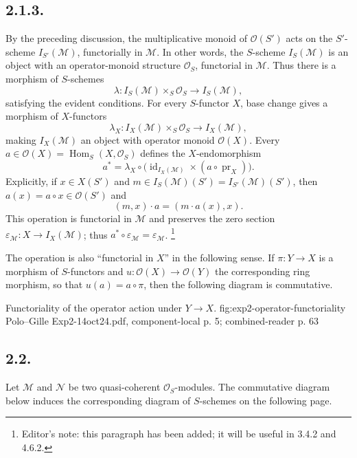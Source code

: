 \subsection*{2.1.3.}
By the preceding discussion, the multiplicative monoid of
\(\mathcal O(S')\) acts on the \(S'\)-scheme
\(I_{S'}(\mathcal M)\), functorially in \(\mathcal M\). In other words,
the \(S\)-scheme \(I_S(\mathcal M)\) is an object with an operator-monoid
structure \(\mathcal O_S\), functorial in \(\mathcal M\). Thus there is
a morphism of \(S\)-schemes
\[
  \lambda:I_S(\mathcal M)\times_S\mathcal O_S
  \longrightarrow I_S(\mathcal M),
\]
satisfying the evident conditions. For every \(S\)-functor \(X\), base
change gives a morphism of \(X\)-functors
\[
  \lambda_X:I_X(\mathcal M)\times_S\mathcal O_S
  \longrightarrow I_X(\mathcal M),
\]
making \(I_X(\mathcal M)\) an object with operator monoid
\(\mathcal O(X)\). Every
\(a\in\mathcal O(X)=\operatorname{Hom}_S(X,\mathcal O_S)\) defines the
\(X\)-endomorphism
\[
  a^*=\lambda_X\circ
  \bigl(\operatorname{id}_{I_X(\mathcal M)}\times(a\circ\operatorname{pr}_X)\bigr).
\]
Explicitly, if \(x\in X(S')\) and
\(m\in I_S(\mathcal M)(S')=I_{S'}(\mathcal M)(S')\), then
\(a(x)=a\circ x\in\mathcal O(S')\) and
\[
  (m,x)\cdot a=(m\cdot a(x),x).
\]
This operation is functorial in \(\mathcal M\) and preserves the zero
section \(\varepsilon_{\mathcal M}:X\to I_X(\mathcal M)\); thus
\(a^*\circ\varepsilon_{\mathcal M}=\varepsilon_{\mathcal M}\).
\footnote{Editor's note: this paragraph has been added; it will be useful
in 3.4.2 and 4.6.2.}

The operation is also ``functorial in \(X\)'' in the following sense. If
\(\pi:Y\to X\) is a morphism of \(S\)-functors and
\(u:\mathcal O(X)\to\mathcal O(Y)\) the corresponding ring morphism,
so that \(u(a)=a\circ\pi\), then the following diagram is commutative.

  {Functoriality of the operator action under \(Y\to X\).}
  {fig:exp2-operator-functoriality}
  {Polo--Gille Exp2-14oct24.pdf, component-local p. 5; combined-reader p. 63}

\subsection*{2.2.}
Let \(\mathcal M\) and \(\mathcal N\) be two quasi-coherent
\(\mathcal O_S\)-modules. The commutative diagram below induces the
corresponding diagram of \(S\)-schemes on the following page.


